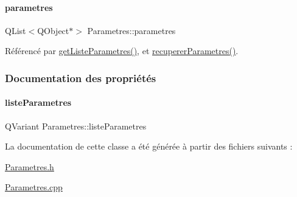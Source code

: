 \paragraph{\texorpdfstring{parametres}{parametres}}
{\footnotesize\ttfamily Q\+List$<$Q\+Object$\ast$$>$ Parametres\+::parametres\hspace{0.3cm}{\ttfamily [private]}}



Référencé par \hyperlink{class_parametres_a1cd756fd21518bcec9349c08a2a3b08f}{get\+Liste\+Parametres()}, et \hyperlink{class_parametres_a853872796d32655f3f1ffc090b6d076a}{recuperer\+Parametres()}.



\subsubsection{Documentation des propriétés}
\mbox{\label{class_parametres_ab37e24ed02c5ff1ffc7bea41016c93ca}} 
\paragraph{\texorpdfstring{liste\+Parametres}{listeParametres}}
{\footnotesize\ttfamily Q\+Variant Parametres\+::liste\+Parametres\hspace{0.3cm}{\ttfamily [read]}}



La documentation de cette classe a été générée à partir des fichiers suivants \+:\begin{DoxyCompactItemize}
\item 
\hyperlink{_parametres_8h}{Parametres.\+h}\item 
\hyperlink{_parametres_8cpp}{Parametres.\+cpp}\end{DoxyCompactItemize}
